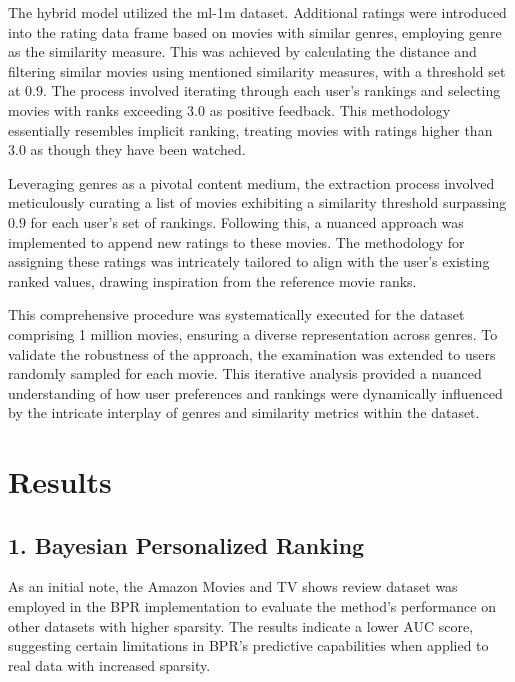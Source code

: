 \documentclass[journal]{IEEEtran}
\begin{document}
The hybrid model utilized the ml-1m dataset. Additional ratings were introduced into the rating data frame based on movies with 
similar genres, employing genre as the similarity measure. This was achieved by calculating the distance and filtering similar 
movies using mentioned similarity measures, with a threshold set at \(0.9\). The process involved iterating through each 
user's rankings and selecting movies with ranks exceeding \(3.0\) as positive feedback. This methodology essentially resembles 
implicit ranking, treating movies with ratings higher than \(3.0\) as though they have been watched.

Leveraging genres as a pivotal content medium, the extraction process involved meticulously curating a list of movies exhibiting a 
similarity threshold surpassing \(0.9\) for each user's set of rankings. Following this, a nuanced approach was implemented to append 
new ratings to these movies. The methodology for assigning these ratings was intricately tailored to align with the user's existing 
ranked values, drawing inspiration from the reference movie ranks.

This comprehensive procedure was systematically executed for the dataset comprising 1 million movies, ensuring a diverse representation 
across genres. To validate the robustness of the approach, the examination was extended to users randomly sampled for each movie. 
This iterative analysis provided a nuanced understanding of how user preferences and rankings were dynamically influenced by the 
intricate interplay of genres and similarity metrics within the dataset.

\section{Results}

\subsection*{1. Bayesian Personalized Ranking}

As an initial note, the Amazon Movies and TV shows review dataset was employed in the BPR implementation to evaluate the method's 
performance on other datasets with higher sparsity. The results indicate a lower AUC score, suggesting certain limitations in BPR's 
predictive capabilities when applied to real data with increased sparsity.
\end{document}
